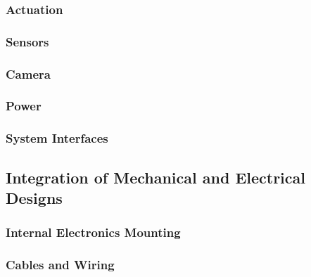     \subsubsection{Actuation}
    \subsubsection{Sensors}
    \subsubsection{Camera}
    \subsubsection{Power}
    \subsubsection{System Interfaces}
    
  \subsection{Integration of Mechanical and Electrical Designs}
    \subsubsection{Internal Electronics Mounting}
    \subsubsection{Cables and Wiring}